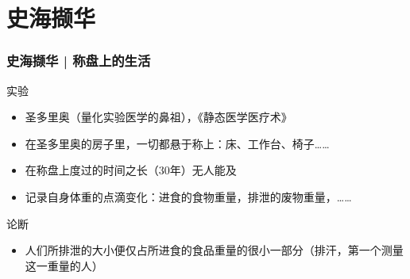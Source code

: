 % 
\section{}

% 
\section{}


\section{史海撷华}
\begin{frame}
  \frametitle{史海撷华 | 称盘上的生活}
  \begin{block}{实验}
    \begin{itemize}
      \item 圣多里奥（量化实验医学的鼻祖），《静态医学医疗术》
      \item 在圣多里奥的房子里，一切都悬于称上：床、工作台、椅子……
      \item 在称盘上度过的时间之长（30年）无人能及
      \item 记录自身体重的点滴变化：进食的食物重量，排泄的废物重量，……
    \end{itemize}
  \end{block}
  \pause
  \begin{block}{论断}
    \begin{itemize}
      \item 人们所排泄的大小便仅占所进食的食品重量的很小一部分（排汗，第一个测量这一重量的人）
    \end{itemize}
  \end{block}
\end{frame}


